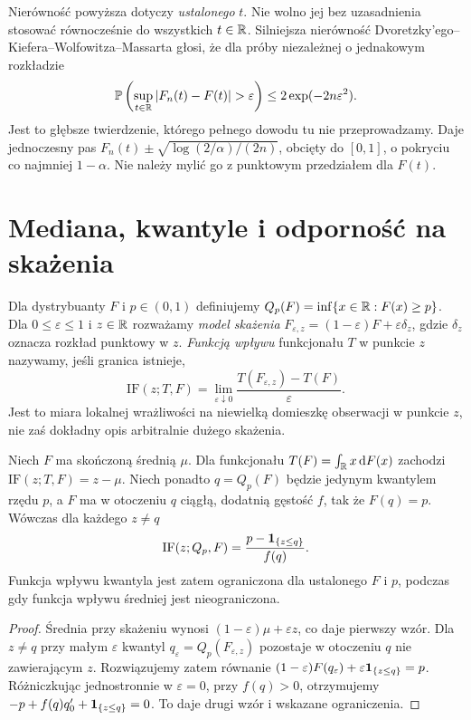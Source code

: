 \begin{uwaga}
Nierówność powyższa dotyczy \emph{ustalonego} $t$.
Nie wolno jej bez uzasadnienia stosować równocześnie
do wszystkich $t\in\mathbb R$. Silniejsza nierówność
Dvoretzky'ego--Kiefera--Wolfowitza--Massarta głosi,
że dla próby niezależnej o jednakowym rozkładzie
\[
 \Prob\left(\sup_{t\in\R}|F_n(t)-F(t)|>\varepsilon\right)
 \le2\exp(-2n\varepsilon^2).
\]
Jest to głębsze twierdzenie, którego pełnego dowodu
tu nie przeprowadzamy. Daje jednoczesny pas
$F_n(t)\pm\sqrt{\log(2/\alpha)/(2n)}$, obcięty do
$[0,1]$, o pokryciu co najmniej $1-\alpha$.
Nie należy mylić go z punktowym przedziałem dla $F(t)$.
\end{uwaga}

\section{Mediana, kwantyle i odporność na skażenia}
\begin{definicja}
Dla dystrybuanty $F$ i $p\in(0,1)$ definiujemy
$Q_p(F)=\inf\{x\in\mathbb R:F(x)\ge p\}$.
Dla $0\le\varepsilon\le1$ i $z\in\mathbb R$ rozważamy
\emph{model skażenia}
$F_{\varepsilon,z}=(1-\varepsilon)F+\varepsilon\delta_z$,
gdzie $\delta_z$ oznacza rozkład punktowy w $z$.
\emph{Funkcją wpływu} funkcjonału $T$ w punkcie $z$ nazywamy,
jeśli granica istnieje,
\[
 \mathrm{IF}(z;T,F)=
 \lim_{\varepsilon\downarrow0}
 \frac{T(F_{\varepsilon,z})-T(F)}{\varepsilon}.
\]
Jest to miara lokalnej wrażliwości na niewielką domieszkę
obserwacji w punkcie $z$, nie zaś dokładny opis
arbitralnie dużego skażenia.
\end{definicja}

\begin{twierdzenie}
\label{thm:influence-mean-quantile}
Niech $F$ ma skończoną średnią $\mu$.
Dla funkcjonału $T(F)=\int_\mathbb R x\,\mathrm d F(x)$
zachodzi $\mathrm{IF}(z;T,F)=z-\mu$.
Niech ponadto $q=Q_p(F)$ będzie jedynym kwantylem
rzędu $p$, a $F$ ma w otoczeniu $q$ ciągłą,
dodatnią gęstość $f$, tak że $F(q)=p$.
Wówczas dla każdego $z\ne q$
\[
 \mathrm{IF}(z;Q_p,F)=
 \frac{p-\mathbf 1_{\{z\le q\}}}{f(q)}.
\]
Funkcja wpływu kwantyla jest zatem ograniczona
dla ustalonego $F$ i $p$, podczas gdy funkcja wpływu
średniej jest nieograniczona.
\end{twierdzenie}
\begin{proof}
Średnia przy skażeniu wynosi
$(1-\varepsilon)\mu+\varepsilon z$, co daje pierwszy wzór.
Dla $z\ne q$ przy małym $\varepsilon$ kwantyl
$q_\varepsilon=Q_p(F_{\varepsilon,z})$ pozostaje
w otoczeniu $q$ nie zawierającym $z$.
Rozwiązujemy zatem równanie
$(1-\varepsilon)F(q_\varepsilon)+
\varepsilon\mathbf 1_{\{z\le q\}}=p$.
Różniczkując jednostronnie w $\varepsilon=0$,
przy $f(q)>0$, otrzymujemy
$-p+f(q)q'_0+\mathbf 1_{\{z\le q\}}=0$.
To daje drugi wzór i wskazane ograniczenia.
\end{proof}

